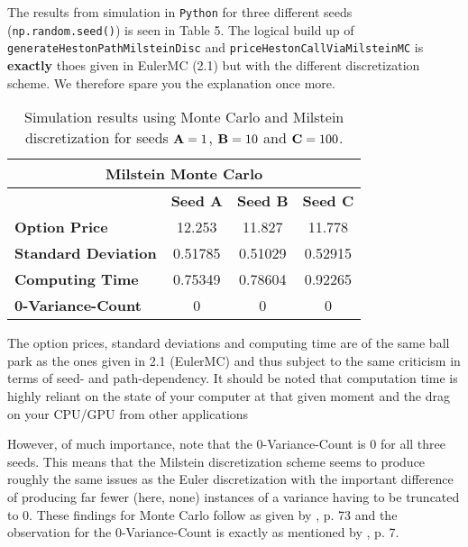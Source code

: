 \documentclass[11pt]{article}
\numberwithin{equation}{section}
\begin{document}
\newpage
The results from simulation in \texttt{Python} for three different seeds
(\texttt{np.random.seed()}) is seen in Table 5. The logical build up of
\texttt{generateHestonPathMilsteinDisc} and
\texttt{priceHestonCallViaMilsteinMC} is \textbf{exactly} thoes given in EulerMC (2.1)
but with the different discretization scheme. We therefore spare you the
explanation once more.
\begin{table}[ht]
    \centering
    \begin{tabular}{|l|c|c|c|}
    \hline
    \multicolumn{4}{|c|}{\textbf{Milstein Monte Carlo}} \\ \hline
    \textbf{} & \textbf{Seed A} & \textbf{Seed B} & \textbf{Seed C} \\ \hline
    \textbf{Option Price} & 12.253 & 11.827 & 11.778 \\ \hline
    \textbf{Standard Deviation} & 0.51785 & 0.51029 & 0.52915 \\ \hline
    \textbf{Computing Time} & 0.75349 & 0.78604 & 0.92265 \\ \hline
    \textbf{0-Variance-Count} & 0 & 0 & 0 \\ \hline
    \end{tabular}
    \caption{Simulation results using Monte Carlo and Milstein discretization for seeds $\text{\textbf{A}}=1$, $\text{\textbf{B}}=10$ and $\text{\textbf{C}}=100$.}
    \label{table:simulation_results2}
\end{table}



The option prices, standard deviations and computing time are of the same ball park as the ones
given in 2.1 (EulerMC) and thus subject to the same criticism in terms of seed-
and path-dependency. It should be noted that computation time is highly
reliant on the state of your computer at that given moment and the drag on your
CPU/GPU from other applications

However, of much importance, note that the 0-Variance-Count is $0$ for
all three seeds. This means that the Milstein discretization scheme seems to
produce roughly the same issues as the Euler discretization with the important
difference of producing far fewer (here, none) instances of a variance having to
be truncated to 0. These findings for Monte Carlo
follow as given by
\cite{Havrylenko2024}, p. 73 and the observation for the 0-Variance-Count is
exactly as mentioned by \cite{Rouah2024}, p. 7. 
\end{document}
